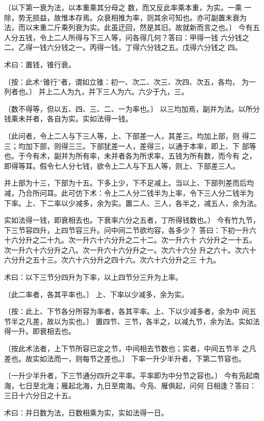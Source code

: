 \documentclass[a4paper,12pt,UTF8,twoside]{ctexbook}
\begin{document}
〔以下第一衰为法，以本重乘其分母之 数，而又反此率乘本重，为实。一乘 一除，势无损益，故惟本存焉。众衰相推为率，则其余可知也。亦可副置末衰为 法，而以末重二斤乘列衰为实。此虽迂回，然是其旧。故就新而言之也。〕 今有五人分五钱，令上二人所得与下三人等，问各得几何？答曰：甲得一钱 六分钱之二。乙得一钱六分钱之一。丙得一钱。丁得六分钱之五。戊得六分钱之 四。

术曰：置钱，锥行衰。

〔按：此术“锥行”者，谓如立锥：初一、次二、次三、次四、次五，各均， 为一列者也。〕 并上二人为九，并下三人为六。六少于九，三。

〔数不得等，但以五、四、三、二、一为率也。〕 以三均加焉，副并为法。以所分钱乘未并者，各自为实。实如法得一钱。

〔此问者，令上二人与下三人等，上、下部差一人，其差三。均加上部，则 得二三；均加下部，则得三三。下部犹差一人，差得三，以通于本率，即上、下 部等也。于今有术，副并为所有率，未并者各为所求率，五钱为所有数，而今有 之，即得等耳。假令七人分七钱，欲令上二人与下五人等，则上、下部差三人。

并上部为十三，下部为十五。下多上少，下不足减上。当以上、下部列差而后均 减，乃合所问耳。此可仿下术：令上二人分二钱半为上率，令下三人分二钱半为 下率。上、下二率以少减多，余为实。置二人、三人，各半之，减五人，余为法。

实如法得一钱，即衰相去也。下衰率六分之五者，丁所得钱数也。〕 今有竹九节，下三节容四升，上四节容三升。问中间二节欲均容，各多少？ 答曰：下初一升六十六分升之二十九。次一升六十六分升之二十二。次一升六十 六分升之一十五。次一升六十六分升之八。次一升六十六分升之一。次六十六分 升之六十。次六十六分升之五十三。次六十六分升之四十六。次六十六分升之三 十九。

术曰：以下三节分四升为下率，以上四节分三升为上率。

〔此二率者，各其平率也。〕 上、下率以少减多，余为实。

〔按：此上、下节各分所容为率者，各其平率。上、下以少减多者，余为中 间五节半之凡差，故以为实也。〕 置四节、三节，各半之，以减九节，余为法。实如法得一升。即衰相去也。

〔按此术法者，上下节所容已定之节，中间相去节数也；实者，中间五节半 之凡差也。故实如法而一，则每节之差也。〕 下率一升少半升者，下第二节容也。

〔一升少半升者，下三节通分四升之平率。平率即为中分节之容也。〕 今有凫起南海，七日至北海；雁起北海，九日至南海。今凫、雁俱起，问何 日相逢？答曰：三日十六分日之十五。

术曰：并日数为法，日数相乘为实，实如法得一日。
\end{document}
